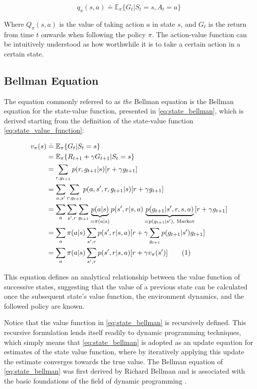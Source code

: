 \documentclass[../report.tex]{subfiles}
\begin{document}
\begin{equation}\label{eq:action_value_function}
    q_{\pi}(s, a) \doteq \mathbb{E}_{\pi}\{G_t | S_t = s, A_t = a\}
\end{equation}

Where $Q_{\pi}(s, a)$ is the value of taking action $a$ in state $s$, and $G_t$ is the return from time $t$ onwards when following the policy $\pi$. The action-value function can be intuitively understood as how worthwhile it is to take a certain action in a certain state.


\subsection{Bellman Equation}
The equation commonly referred to as \textit{the} Bellman equation is the Bellman equation for the state-value function, presented in \autoref{eq:state_bellman}, which is derived starting from the definition of the state-value function \autoref{eq:state_value_function}:

\begin{align*}
    v_{\pi}(s) &\doteq \mathbb{E}_{\pi}\{G_t | S_t = s\} \\
    &= \mathbb{E}_{\pi}\{R_{t+1} + \gamma G_{t+1} | S_t = s\}\\
    &= \sum\limits_{r, g_{t+1}}p(r,g_{t+1}|s)[r + \gamma g_{t+1}]\\
    &= \sum\limits_{a, s'}\sum\limits_{r, g_{t+1}}p(a, s', r, g_{t+1}|s)[r + \gamma g_{t+1}]\\
    &= \sum\limits_{a}\sum\limits_{s',r}\sum\limits_{g_{t+1}}\underbrace{p(a|s)}_{= \pi(a|s)}p(s',r|s,a)\underbrace{p(g_{t+1}|s', r, s, a)}_{= p(g_{t+1}|s') \text{, Markov}}[r + \gamma g_{t+1}]\\
    &= \sum\limits_{a}\pi(a|s)\sum\limits_{s',r}p(s',r|s,a)[r + \gamma \sum\limits_{g_{t+1}}p(g_{t+1}|s')g_{t+1}]\\
    &= \sum\limits_{a}\pi(a|s) \sum\limits_{s', r} p(s', r|s, a)[r + \gamma v_{\pi}(s')] \stepcounter{equation}\tag{\theequation}\label{eq:state_bellman}\\
\end{align*}

This equation defines an analytical relationship between the value function of successive states, suggesting that the value of a previous state can be calculated once the subsequent state's value function, the environment dynamics, and the followed policy are known.

Notice that the value function in \autoref{eq:state_bellman} is recursively defined. This recursive formulation lends itself readily to dynamic programming techniques, which simply means that \autoref{eq:state_bellman} is adopted as an update equation for estimates of the state value function, where by iteratively applying this update the estimate converges towards the true value. The Bellman equation of \autoref{eq:state_bellman} was first derived by Richard Bellman and is associated with the basic foundations of the field of dynamic programming \cite{dp}.
\end{document}
